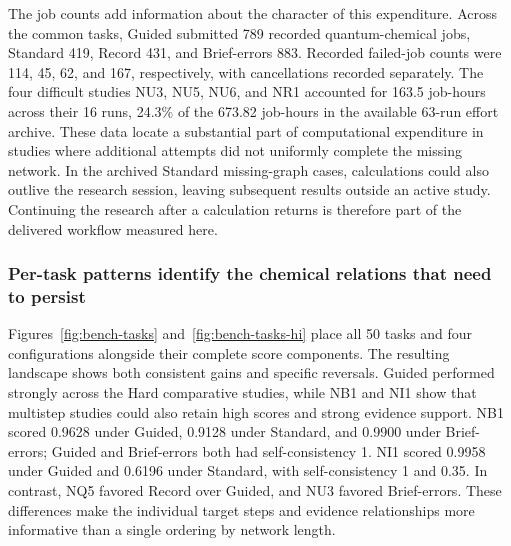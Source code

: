 The job counts add information about the character of this expenditure. Across the common tasks, Guided submitted 789 recorded quantum-chemical jobs, Standard 419, Record 431, and Brief-errors 883. Recorded failed-job counts were 114, 45, 62, and 167, respectively, with cancellations recorded separately. The four difficult studies NU3, NU5, NU6, and NR1 accounted for 163.5 job-hours across their 16 runs, 24.3\% of the 673.82 job-hours in the available 63-run effort archive. These data locate a substantial part of computational expenditure in studies where additional attempts did not uniformly complete the missing network. In the archived Standard missing-graph cases, calculations could also outlive the research session, leaving subsequent results outside an active study. Continuing the research after a calculation returns is therefore part of the delivered workflow measured here.





\FloatBarrier

\subsubsection{Per-task patterns identify the chemical relations that need to persist}

Figures~\ref{fig:bench-tasks} and~\ref{fig:bench-tasks-hi} place all 50 tasks and four configurations alongside their complete score components. The resulting landscape shows both consistent gains and specific reversals. Guided performed strongly across the Hard comparative studies, while NB1 and NI1 show that multistep studies could also retain high scores and strong evidence support. NB1 scored 0.9628 under Guided, 0.9128 under Standard, and 0.9900 under Brief-errors; Guided and Brief-errors both had self-consistency 1. NI1 scored 0.9958 under Guided and 0.6196 under Standard, with self-consistency 1 and 0.35. In contrast, NQ5 favored Record over Guided, and NU3 favored Brief-errors. These differences make the individual target steps and evidence relationships more informative than a single ordering by network length.

